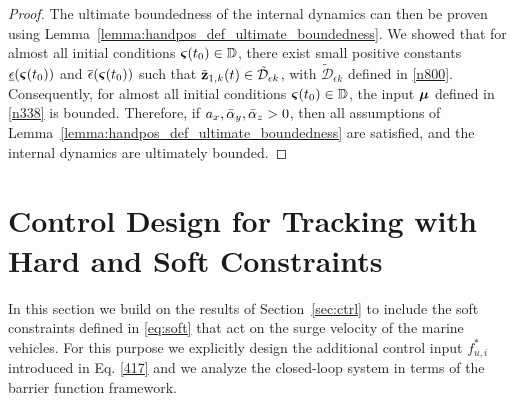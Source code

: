 \begin{proof}
	The ultimate boundedness of the internal dynamics can then be proven using Lemma~\ref{lemma:handpos_def_ultimate_boundedness}.
	We showed that for almost all initial conditions $\bm{\varsigma}(t_0)\in\mathbb{D}$, there exist small positive constants $\underline\epsilon(\bm{\varsigma}(t_0))$ and $\overline\epsilon(\bm{\varsigma}(t_0))$ such that $\tilde{\mathbf{z}}_{1, k}(t)\in\mathcal{\tilde D}_{\epsilon k}$, with $\mathcal{\tilde D}_{\epsilon k}$ defined in \eqref{n800}.
	Consequently, for almost all initial conditions $\bm{\varsigma}(t_0)\in\mathbb{D}$, the input $\bm{\mu}$ defined in \eqref{n338} is bounded.
	Therefore, if $a_x, \Bar{\alpha}_y, \Bar{\alpha}_z > 0$, then all assumptions of Lemma~\ref{lemma:handpos_def_ultimate_boundedness} are satisfied, and the internal dynamics are ultimately bounded.
\end{proof}

\section{Control Design for Tracking with Hard and Soft Constraints}
\label{sec:soft}

In this section we build on the results of Section~\ref{sec:ctrl} to include the soft constraints defined in \eqref{eq:soft} that act on the surge velocity of the marine vehicles.
For this purpose we explicitly design the additional control input $f_{u, i}^*$ introduced in Eq. \eqref{417} and we analyze the closed-loop system in terms of the barrier function framework.



